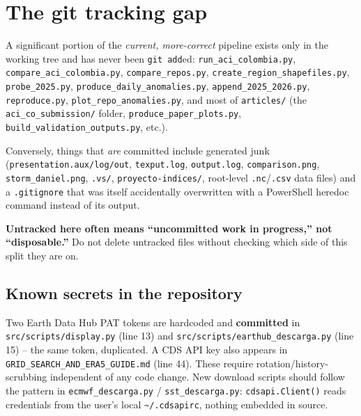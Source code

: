 \documentclass[11pt]{article}
\begin{document}
\section{The git tracking gap}
\label{sec:git-gap}

A significant portion of the \emph{current, more-correct} pipeline exists
only in the working tree and has never been \texttt{git add}ed:
\texttt{run\_aci\_colombia.py}, \texttt{compare\_aci\_colombia.py},
\texttt{compare\_repos.py}, \texttt{create\_region\_shapefiles.py},
\texttt{probe\_2025.py}, \texttt{produce\_daily\_anomalies.py},
\texttt{append\_2025\_2026.py}, \texttt{reproduce.py},
\texttt{plot\_repo\_anomalies.py}, and most of \texttt{articles/} (the
\texttt{aci\_co\_submission/} folder, \texttt{produce\_paper\_plots.py},
\texttt{build\_validation\_outputs.py}, etc.).

Conversely, things that \emph{are} committed include generated junk
(\texttt{presentation.aux/log/out}, \texttt{texput.log},
\texttt{output.log}, \texttt{comparison.png}, \texttt{storm\_daniel.png},
\texttt{.vs/}, \texttt{proyecto-indices/}, root-level \texttt{.nc}/\texttt{.csv}
data files) and a \texttt{.gitignore} that was itself accidentally
overwritten with a PowerShell heredoc command instead of its output.

\textbf{Untracked here often means ``uncommitted work in progress,'' not
``disposable.''} Do not delete untracked files without checking which side
of this split they are on.

\subsection{Known secrets in the repository}
\label{sec:secrets}

Two Earth Data Hub PAT tokens are hardcoded and \textbf{committed} in
\texttt{src/scripts/display.py} (line 13) and
\texttt{src/scripts/earthub\_descarga.py} (line 15) -- the same token,
duplicated. A CDS API key also appears in
\texttt{GRID\_SEARCH\_AND\_ERA5\_GUIDE.md} (line 44). These require
rotation/history-scrubbing independent of any code change. New download
scripts should follow the pattern in \texttt{ecmwf\_descarga.py} /
\texttt{sst\_descarga.py}: \texttt{cdsapi.Client()} reads credentials from
the user's local \texttt{\textasciitilde/.cdsapirc}, nothing embedded in
source.

\end{document}
